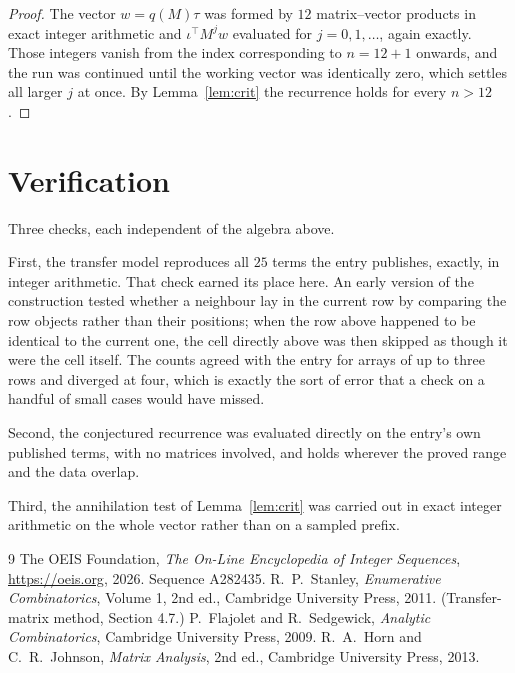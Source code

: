 \documentclass[11pt,a4paper]{article}
\theoremstyle{plain}
\theoremstyle{definition}
\begin{document}
\begin{proof}
The vector $w=q(M)\tau$ was formed by $12$ matrix--vector products in exact integer
arithmetic and $\iota^{\!\top}M^{j}w$ evaluated for $j=0,1,\dots$, again exactly. Those
integers vanish from the index corresponding to $n=12+1$ onwards, and the run was
continued until the working vector was identically zero, which settles all larger $j$ at once.
By Lemma~\ref{lem:crit} the recurrence holds for every $n>12$.
\end{proof}

\section{Verification}

Three checks, each independent of the algebra above.

First, the transfer model reproduces all $25$ terms the entry publishes, exactly, in
integer arithmetic. That check earned its place here. An early version of the construction
tested whether a neighbour lay in the current row by comparing the row objects rather
than their positions; when the row above happened to be identical to the current one, the
cell directly above was then skipped as though it were the cell itself. The counts agreed with
the entry for arrays of up to three rows and diverged at four, which is exactly the sort of
error that a check on a handful of small cases would have missed.

Second, the conjectured recurrence was evaluated directly on the entry's own published terms,
with no matrices involved, and holds wherever the proved range and the data overlap.

Third, the annihilation test of Lemma~\ref{lem:crit} was carried out in exact integer
arithmetic on the whole vector rather than on a sampled prefix.

\begin{thebibliography}{9}
 The OEIS Foundation, \emph{The On-Line Encyclopedia of Integer
Sequences}, \url{https://oeis.org}, 2026. Sequence A282435.
 R.~P.~Stanley, \emph{Enumerative Combinatorics}, Volume 1, 2nd ed.,
Cambridge University Press, 2011. (Transfer-matrix method, Section 4.7.)
 P.~Flajolet and R.~Sedgewick, \emph{Analytic Combinatorics}, Cambridge
University Press, 2009.
 R.~A.~Horn and C.~R.~Johnson, \emph{Matrix Analysis}, 2nd ed., Cambridge
University Press, 2013.
\end{thebibliography}
\end{document}
